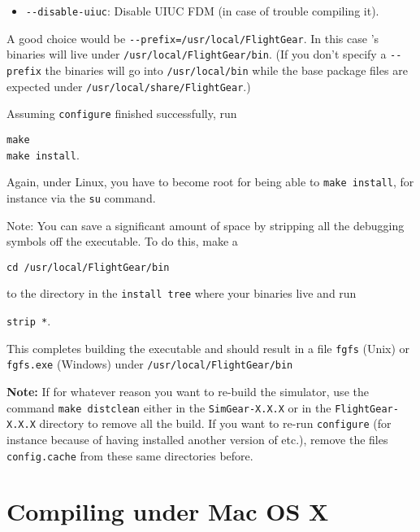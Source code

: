 \begin{enumerate}
\begin{itemize}
\item{\texttt{-$ $-disable-uiuc}}: Disable UIUC FDM (in case of trouble compiling it).
\end{itemize}

A good choice would be \texttt{-$ $-prefix=/usr/local/FlightGear}. In this case
\FlightGear{}'s binaries will live under
\texttt{/usr/local/FlightGear/bin}. (If you don't specify a \texttt{-$ $-prefix} the binaries will go into
\texttt{/usr/local/bin} while the base package files are expected under
\texttt{/usr/local/share/FlightGear}.)

Assuming \texttt{configure} finished successfully, run
 \medskip

        \texttt{make}\\
        \texttt{make install}.

 \noindent
 Again, under Linux, you have to become root for being able to \texttt{make
install}, for instance via the \texttt{su} command.

 \noindent
 Note:  You can save a significant amount of space by stripping all the
    debugging symbols off the executable.  To do this, make a
     \medskip

    \texttt{cd /usr/local/FlightGear/bin}

 \noindent
    to the directory in the \texttt{install tree} where your binaries live and run
     \medskip

    \texttt{strip *}.
  \end{enumerate}


 This completes building the executable and should result in a file \texttt{fgfs} (Unix) or
 \texttt{fgfs.exe} (Windows) under \texttt{/usr/local/FlightGear/bin}

\textbf{Note:} If for whatever reason you want to re-build the simulator, use the command
\texttt{make distclean} either in the \texttt{SimGear-X.X.X} or in the
\texttt{FlightGear-X.X.X} directory to remove all the build. If you want to re-run
\texttt{configure} (for instance because of having installed another version of \PLIB{}
etc.), remove the files \texttt{config.cache} from these same directories before.

\section{Compiling \FlightGear{} under Mac OS X }

